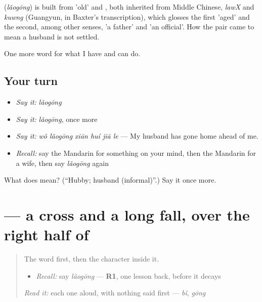 \begin{cousinweb}
\textbf{} (\emph{lǎogōng}) is built from  'old' and , both inherited from Middle Chinese, \emph{lawX} and \emph{kuwng} (Guangyun, in Baxter's transcription), which glosses the first 'aged' and the second, among other senses, 'a father' and 'an official'. How the pair came to mean a husband is not settled.
\end{cousinweb}

\begin{grammarlens}[title={What you've built}]
One more word for what I have and can do.
\end{grammarlens}

\subsection*{Your turn}
\begin{itemize}
\raggedright
  \item \emph{Say it:} \emph{lǎogōng}
  \item \emph{Say it:} \emph{lǎogōng}, once more
  \item \emph{Say it:} \emph{wǒ lǎogōng xiān huí jiā le} — My husband has gone home ahead of me.
  \item \emph{Recall:} say the Mandarin for something on your mind, then the Mandarin for a wife, then say \emph{lǎogōng} again
\end{itemize}

\begin{tcolorbox}[breakable,colback=teal!4,colframe=teal!35!black,title={Before you move on}]
What does  mean? (\textquotedblleft{}Hubby; husband (informal)\textquotedblright{}.) Say it once more.
\end{tcolorbox}
\section[\texorpdfstring{\zh{老} (lǎo)}{老 (lǎo)}]{ — a cross and a long fall, over the right half of }

\label{lesson:ZH-W272-lao-old}



\begin{quote}
The word first, then the character inside it.

\begin{itemize}
\raggedright
  \item \emph{Recall:} say \emph{lǎogōng} — \textbf{R1}, one lesson back, before it decays
\end{itemize}

\begin{quote}
 
\end{quote}

\emph{Read it:} each one aloud, with nothing said first — \emph{bǐ}, \emph{gōng}
\end{quote}

